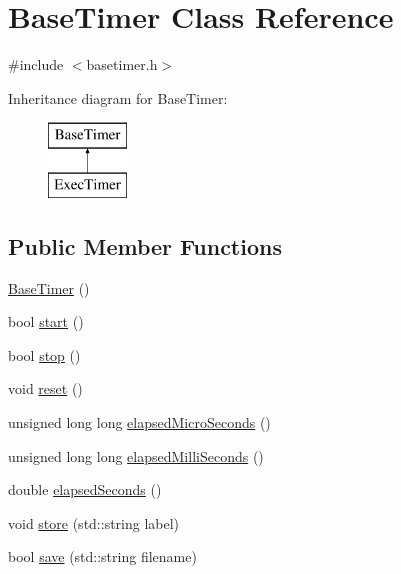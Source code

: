 \hypertarget{class_base_timer}{\section{Base\-Timer Class Reference}
\label{class_base_timer}
}


{\ttfamily \#include $<$basetimer.\-h$>$}

Inheritance diagram for Base\-Timer\-:\begin{figure}[H]
\begin{center}
\leavevmode
\includegraphics[height=2.000000cm]{class_base_timer}
\end{center}
\end{figure}
\subsection*{Public Member Functions}
\begin{DoxyCompactItemize}
\item 
\hyperlink{class_base_timer_a1a03059373391ed51149d21182db8fa4}{Base\-Timer} ()
\item 
bool \hyperlink{class_base_timer_ad1a4dc398bd40b4c19bb9f5687358e94}{start} ()
\item 
bool \hyperlink{class_base_timer_ae0ad1c2cc4decd0e03149eb514edcaa6}{stop} ()
\item 
void \hyperlink{class_base_timer_a91b31d11717b29761f38e8ea43d39063}{reset} ()
\item 
unsigned long long \hyperlink{class_base_timer_ad5d4815b9a6ca8042316fccaef433647}{elapsed\-Micro\-Seconds} ()
\item 
unsigned long long \hyperlink{class_base_timer_a0d2fa9af0f004932607be09748265db8}{elapsed\-Milli\-Seconds} ()
\item 
double \hyperlink{class_base_timer_aaa9c1ff59a32c340bf0244df37ad5a86}{elapsed\-Seconds} ()
\item 
void \hyperlink{class_base_timer_a078e5499b51d151695649dc333efdde6}{store} (std\-::string label)
\item 
bool \hyperlink{class_base_timer_a97047266ceaae87631d025957d3dffc8}{save} (std\-::string filename)
\end{DoxyCompactItemize}



